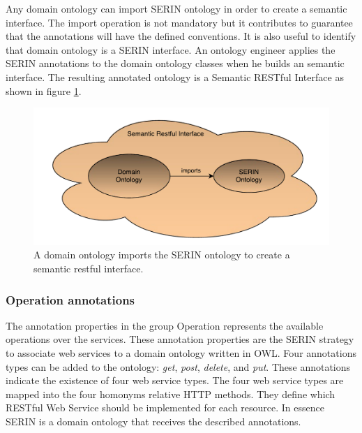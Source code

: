 \documentclass{singlecol-new}
\theoremstyle{TH}{
\newtheorem{lemma}{Lemma}
\newtheorem{theorem}[lemma]{Theorem}
\newtheorem{corrolary}[lemma]{Corrolary}
\newtheorem{conjecture}[lemma]{Conjecture}
\newtheorem{proposition}[lemma]{Proposition}
\newtheorem{claim}[lemma]{Claim}
\newtheorem{stheorem}[lemma]{Wrong Theorem}
\newtheorem{algorithm}{Algorithm}
}
\theoremstyle{THrm}{
\newtheorem{definition}{Definition}[section]
\newtheorem{question}{Question}[section]
\newtheorem{remark}{Remark}
\newtheorem{scheme}{Scheme}
}
\theoremstyle{THhit}{
\newtheorem{case}{Case}[section]
}
\begin{document}

Any domain ontology can import SERIN ontology in order to create a semantic interface. 
The import operation is not mandatory but it contributes to guarantee that the annotations will have the defined conventions. 
It is also useful to identify that domain ontology is a SERIN interface.
An ontology engineer applies the SERIN annotations to the domain ontology classes when he builds an semantic interface.
The resulting annotated ontology is a Semantic RESTful Interface as shown in figure \ref{fig:serinimport}.

\begin{figure}[!htb]
	\includegraphics[scale=.55]{images/serin-import.pdf}
	\centering
	\caption{A domain ontology imports the SERIN ontology to create a semantic restful interface.}
	\label{fig:serinimport}
\end{figure}


\subsubsection{Operation annotations}
\label{sec:operationannot}
The annotation properties in the group Operation represents the available operations over the services. 
These annotation properties are the SERIN strategy to associate web services to a domain ontology written in OWL. 
Four annotations types can be added to the ontology: \textit{get}, \textit{post}, \textit{delete}, and \textit{put}. 
These annotations indicate the existence of four web service types. 
The four web service types are mapped into the four homonyms relative HTTP methods. 
They define which RESTful Web Service should be implemented for each resource.
In essence SERIN is a domain ontology that receives the described annotations.
\end{document}
